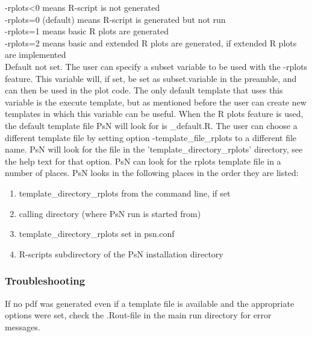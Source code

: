 \begin{optionlist}
-rplots<0 means R-script is not generated\\ 
-rplots=0 (default) means R-script is generated but not run\\ 
-rplots=1 means basic R plots are generated\\													  
-rplots=2 means basic and extended R plots are generated, if extended R plots are implemented\\													  
\nextopt
{}
Default not set. The user can specify a subset variable to be used with the -rplots feature. This variable will, if set, be set as subset.variable in the preamble, and can then be used in the plot code. The only default template that uses this variable is the execute template, but as mentioned before the user can create new templates in which this variable can be useful.
\nextopt
{}
When the R plots feature is used, the default template file PsN will look for is \guidetoolname\_default.R. The user can choose a different template file by setting option -template\_file\_rplots to a different file name. PsN will look for the file in the 'template\_directory\_rplots' directory, see the help text for that option.
\nextopt
{}
PsN can look for the rplots template file in a number of places. PsN looks in the following places in the order they are listed:
\begin{enumerate}
\item template\_directory\_rplots from the command line, if set 
\item calling directory (where PsN run is started from)
\item template\_directory\_rplots set in psn.conf 
\item R-scripts subdirectory of the PsN installation directory
\end{enumerate}
\nextopt

\end{optionlist}

\subsubsection*{Troubleshooting}
If no pdf was generated even if a template file is available and the appropriate options were set, check the .Rout-file in the main run directory for error messages.
